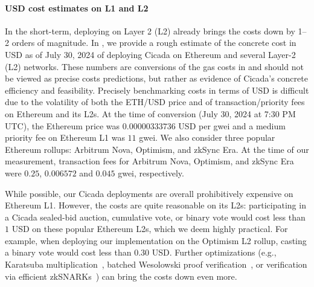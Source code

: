 \paragraph{USD cost estimates on L1 and L2}
In the short-term, deploying on Layer 2 (L2) already brings the costs down by 1--2 orders of magnitude. 
In , we provide a rough estimate of the concrete cost in USD as of July 30, 2024 of deploying Cicada on Ethereum and several Layer-2 (L2) networks. These numbers are conversions of the gas costs in  and should not be viewed as precise costs predictions, but rather as evidence of Cicada's concrete efficiency and feasibility. Precisely benchmarking costs in terms of USD is difficult due to the volatility of both the ETH/USD price and of transaction/priority fees on Ethereum and its L2s.
At the time of conversion (July 30, 2024 at 7:30 PM UTC), the Ethereum price was $0.00000333736$ USD per gwei and a medium priority fee on Ethereum L1 was $11$ gwei. We also consider three popular Ethereum rollups: Arbitrum Nova, Optimism, and zkSync Era. At the time of our measurement, transaction fees for Arbitrum Nova, Optimism, and zkSync Era were $0.25$, $0.006572$ and  $0.045$ gwei, respectively. 

While possible, our Cicada deployments are overall prohibitively expensive on Ethereum L1. However, the costs are quite reasonable on its L2s: participating in a Cicada sealed-bid auction, cumulative vote, or binary vote would cost less than $1$ USD on these popular Ethereum L2s, which we deem highly practical.
For example, when deploying our implementation on the Optimism L2 rollup, casting a binary vote would cost less than 0.30 USD.
Further optimizations (e.g., Karatsuba multiplication~\cite{KarOfm62}, batched Wesolowski proof verification~\cite{TCC:Rotem21}, or verification via efficient zkSNARKs~\cite{EC:Groth16,EPRINT:GabWilCio19}) can bring the costs down even more.